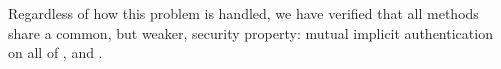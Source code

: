 \documentclass[runningheads, envcountsame, hidelinks, a4paper, draft, x11names]{llncs}
\begin{document}
Regardless of how this problem is handled, we have verified that all methods
share a common, but weaker, security property: mutual implicit authentication
on all of \mGxy{}, \mGiy{} and \mGrx{}.
%

%
%

\end{document}

